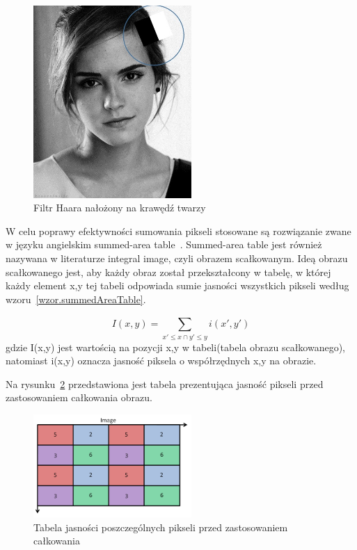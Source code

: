 \documentclass[a4paper,twoside,12pt]{book}
\begin{document}
    \begin{figure}
        \centering
        \includegraphics[width=6cm]{Obrazy/haarEmmaWatson.jpg}
        \caption{Filtr Haara nałożony na krawędź twarzy~\cite{haar}}
        \label{fig.haarEmmaWatson}
    \end{figure}

    W celu poprawy efektywności sumowania pikseli stosowane są
    rozwiązanie zwane w języku angielskim summed-area table~\cite{computerVision}. Summed-area table jest również
    nazywana w literaturze integral image, czyli obrazem scałkowanym.
    Ideą obrazu scałkowanego jest,
    aby każdy obraz
    został
    przekształcony w
    tabelę, w której każdy element x,y tej tabeli odpowiada sumie jasności wszystkich pikseli według wzoru~\ref{wzor.summedAreaTable}.

    \large
    \begin{equation}
        I(x,y) = \sum_{{x}'\leq x \cap {y}'\leq y}^{} i({x}',{y}')
        \label{wzor.summedAreaTable}
    \end{equation}
    \normalsize
    gdzie I(x,y) jest wartością na pozycji x,y w tabeli(tabela obrazu scałkowanego), natomiast i(x,y) oznacza jasność piksela o
    współrzędnych x,y na obrazie.

    Na rysunku~\ref{fig.przedCalkowaniem} przedstawiona jest tabela prezentująca jasność pikseli przed
    zastosowaniem całkowania obrazu.
    \begin{figure}
        \centering
        \includegraphics[width=6cm]{Obrazy/przedCalkowaniem.jpg}
        \caption{Tabela jasności poszczególnych pikseli przed zastosowaniem całkowania~\cite{integralImages}}
        \label{fig.przedCalkowaniem}
    \end{figure}
\end{document}
